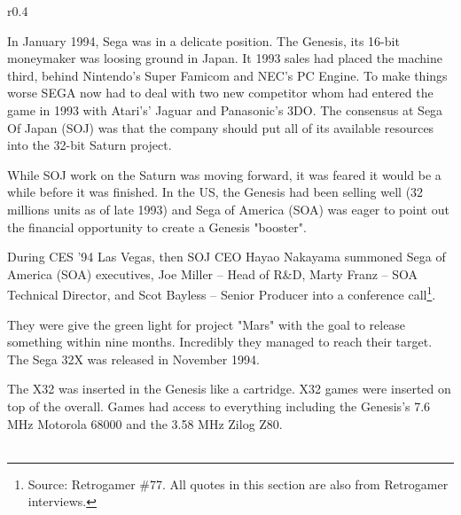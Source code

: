 \begin{wrapfigure}[4]{r}{0.4\textwidth}{
\centering {}}
\end{wrapfigure}
In January 1994, Sega was in a delicate position. The Genesis, its 16-bit moneymaker was loosing ground in Japan. It  1993 sales had placed the machine third, behind Nintendo's Super Famicom and NEC's PC Engine. To make things worse SEGA now had to deal with two new competitor whom had entered the game in 1993 with Atari's' Jaguar and Panasonic's 3DO. The consensus at Sega Of Japan (SOJ) was that the company should put all of its available resources into the 32-bit Saturn project.\\
\par
While SOJ work on the Saturn was moving forward, it was feared it would be a while before it was finished. In the US, the Genesis had been selling well (32 millions units as of late 1993) and Sega of America (SOA) was eager to point out the financial opportunity to create a Genesis "booster".\\
\par
During CES '94 Las Vegas, then SOJ CEO Hayao Nakayama summoned Sega of America (SOA) executives, Joe Miller -- Head of R\&D, Marty Franz -- SOA Technical Director, and Scot Bayless -- Senior Producer into a conference call\footnote{Source: Retrogamer \#77. All quotes in this section are also from Retrogamer interviews.}.\\
\par 
They were give the green light for project "Mars" with the goal to release something within nine months. Incredibly they managed to reach their target. The Sega 32X was released in November 1994.\\
\par
{}%
\par
The X32 was inserted in the Genesis like a cartridge. X32 games were inserted on top of the overall. Games had access to everything including the Genesis's 7.6 MHz Motorola 68000 and the 3.58 MHz Zilog Z80.\\

\\
\par

